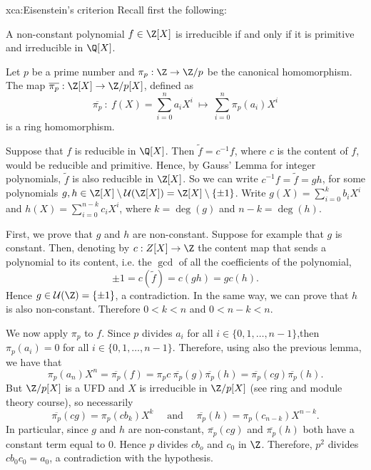\begin{sol}{xca:Eisenstein's criterion}
Recall first the following:
\begin{lemma*}
\label{Gauss lem}
A non-constant polynomial $f\in \Z[X]$ is irreducible if and only if it is primitive and irreducible in $\Q[X]$.
\end{lemma*}
\begin{lemma*}
\label{mod p is a hom}
   Let $p$ be a prime number and $\pi_p:\Z\to\Z/p$
   be the canonical homomorphism. 
    The map $\overline{\pi_p}:\Z[X]\to \Z/p[X]$, defined as 
    \[
    \overline{\pi_p} ~:~ f(X)=\sum_{i=0}^na_iX^i~\longmapsto~\sum_{i=0}^n\pi_p(a_i)X^i
    \]
    is a ring homomorphism.
\end{lemma*}

    Suppose that $f$ is reducible in $\Q[X]$.
    Then $\widetilde{f}=c^{-1}f$, where $c$ is the content of $f$,
    would be reducible and primitive.
    Hence, by Gauss' Lemma for integer polynomials, $\widetilde{f}$ is also 
    reducible in $\Z[X]$.
    So we can write $c^{-1}f=\widetilde{f}=gh$, for some 
    polynomials $g,h\in \Z[X]\setminus\mathcal{U}(\Z[X])=\Z[X]\setminus\{\pm1\}$.
    Write $g(X)=\sum_{i=0}^k b_iX^i$ and $h(X)=\sum_{i=0}^{n-k} c_iX^i$, where $k=\deg(g)$ and $n-k=\deg(h)$.
    
    First, we prove that $g$ and $h$ are non-constant.
    Suppose for example that $g$ is constant.
    Then, denoting by $c:Z[X]\to \Z$ the content map that sends a polynomial to its content, i.e. the $\gcd$ of all the coefficients of the polynomial,
    \[
    \pm 1=c(\widetilde{f})=c(gh)=gc(h).
    \]
    Hence $g\in \mathcal{U}(\Z)=\{\pm1\}$, a contradiction. In the same way, we can prove that $h$ is also non-constant.
    Therefore $0<k<n$ and $0<n-k<n$.
    
    We now apply $\pi_p$ to $f$.
    Since $p$ divides $a_i$ for all 
    $i\in\{0,1,\dots, n-1\}$,then $\pi_p(a_i)=0$ for all 
    $i\in\{0,1,\dots, n-1\}$.
    Therefore, using also the previous lemma, we have that 
    \[
    \pi_p(a_n)X^n=\overline{\pi_p}(f)=\pi_p{c}\:\overline{\pi_p}(g)\overline{\pi_p}(h)=
    \overline{\pi_p}(cg)\overline{\pi_p}(h).
    \]
    But $\Z/p[X]$ is a UFD and $X$ is irreducible in $\Z/p[X]$ (see ring and module theory course), so necessarily
    \[
    \overline{\pi_p}(cg)=\pi_p(cb_k)X^k \quad\text{ and }\quad\overline{\pi_p}(h)=\pi_p(c_{n-k})X^{n-k}.
    \]
    In particular, since $g$ and $h$ are non-constant, $\overline{\pi_p}(cg)$ and $\overline{\pi_p}(h)$ both have a constant term equal to 0.
    Hence $p$ divides $cb_o$ and $c_0$ in $\Z$.
    Therefore, $p^2$ divides $cb_0c_0=a_0$,
    a contradiction with the hypothesis.
\end{sol}

